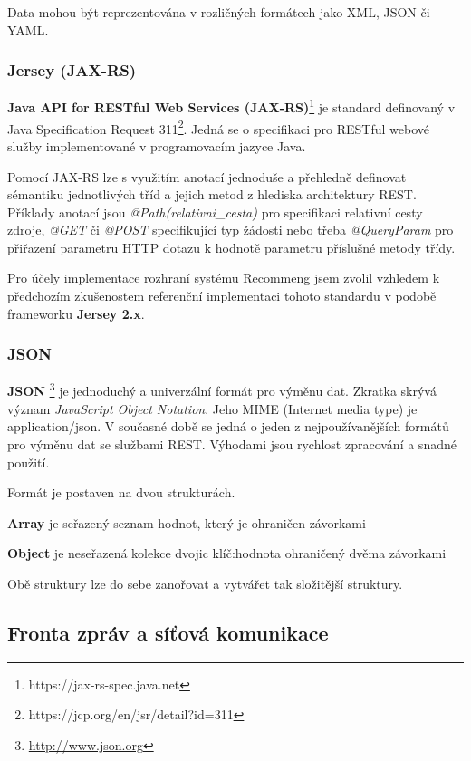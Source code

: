 \documentclass[thesis=M,czech]{FITthesis}[2014/05/07]
\begin{document}
Data mohou být reprezentována v rozličných formátech jako XML, JSON či YAML.

\subsubsection{Jersey (JAX-RS)}
\textbf{Java API for RESTful Web Services (JAX-RS)}\footnote{https://jax-rs-spec.java.net} je standard definovaný v Java Specification Request 311\footnote{https://jcp.org/en/jsr/detail?id=311}. Jedná se o specifikaci pro RESTful webové služby implementované v programovacím jazyce Java.

Pomocí JAX-RS lze s využitím anotací jednoduše a přehledně definovat sémantiku jednotlivých tříd a jejich metod z hlediska architektury REST. Příklady anotací jsou \emph{@Path(relativni\_cesta)} pro specifikaci relativní cesty zdroje, \emph{@GET} či \emph{@POST} specifikující typ žádosti nebo třeba \emph{@QueryParam} pro přiřazení parametru HTTP dotazu k hodnotě parametru příslušné metody třídy.

Pro účely implementace rozhraní systému Recommeng jsem zvolil vzhledem k předchozím zkušenostem referenční implementaci tohoto standardu v podobě frameworku \textbf{Jersey 2.x}. 

\subsubsection{JSON}
\label{json}
\textbf{JSON }\footnote{\url{http://www.json.org}} je jednoduchý a univerzální formát pro výměnu dat. Zkratka skrývá význam \emph{JavaScript Object Notation}. Jeho MIME (Internet media type) je application/json. V současné době se jedná o jeden z nejpoužívanějších formátů pro výměnu dat se službami REST. Výhodami jsou rychlost zpracování a snadné použití.

Formát je postaven na dvou strukturách. 

\begin{description}
	\item \textbf{Array} je seřazený seznam hodnot, který je ohraničen závorkami
	\item \textbf{Object} je neseřazená kolekce dvojic klíč:hodnota ohraničený dvěma závorkami
\end{description}

Obě struktury lze do sebe zanořovat a vytvářet tak složitější struktury.

\subsection{Fronta zpráv a síťová komunikace}
\end{document}
